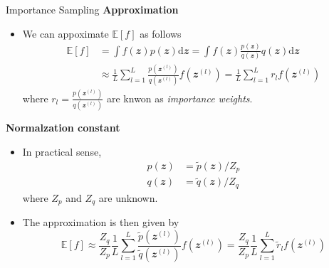 \documentclass{bredelebeamer}
\begin{document}
\begin{frame}{Importance Sampling}
  \textbf{Approximation} \\
  \begin{itemize}
    \item We can appoximate $\mathbb{E}[f]$ as follows
    \begin{equation}
      \begin{split}
        \mathbb{E}[f]
        &= \int f(\mathbfit{z})p(\mathbfit{z}) \mathrm{d}\mathbfit{z}
         = \int f(\mathbfit{z}) \frac{p(\mathbfit{z})}{q(\mathbfit{z})} q(\mathbfit{z}) \mathrm{d}\mathbfit{z} \\
        &\approx \frac{1}{L} \sum_{l=1}^{L} \frac{p(\mathbfit{z}^{(l)})}{q(\mathbfit{z}^{(l)})} f(\mathbfit{z}^{(l)})
         =       \frac{1}{L} \sum_{l=1}^{L} r_l f(\mathbfit{z}^{(l)})
      \end{split}
    \end{equation}
    where $r_l = \frac{p(\mathbfit{z}^{(l)})}{q(\mathbfit{z}^{(l)})}$ are knwon as
    \textit{importance weights}.
  \end{itemize}

  \textbf{Normalzation constant} \\
  \begin{itemize}
    \item In practical sense,
    \begin{equation}
      \begin{split}
            p(\mathbfit{z}) &= \tilde{p}(\mathbfit{z})/Z_p \\
            q(\mathbfit{z}) &= \tilde{q}(\mathbfit{z})/Z_q
      \end{split}
    \end{equation}
    where $Z_p$ and $Z_q$ are unknown.
    \item The approximation is then given by
    \begin{equation}
      \mathbb{E}[f]
      \approx \frac{Z_q}{Z_p} \frac{1}{L} \sum_{l=1}^{L} \frac{\tilde{p}(\mathbfit{z}^{(l)})}{\tilde{q}(\mathbfit{z}^{(l)})} f(\mathbfit{z}^{(l)})
      =       \frac{Z_q}{Z_p} \frac{1}{L} \sum_{l=1}^{L} \tilde{r}_l f(\mathbfit{z}^{(l)})
    \end{equation}
  \end{itemize}
\end{frame}
\end{document}
